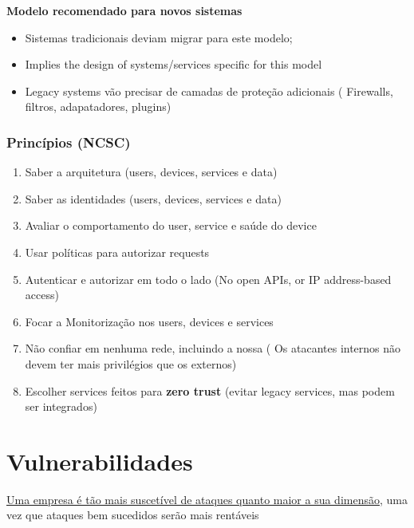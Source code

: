\documentclass{article}
\begin{document}
\begin{flushleft}
\begin{flushleft}
    \textbf{Modelo recomendado para novos sistemas}
    \begin{itemize}
      \item Sistemas tradicionais deviam migrar para este modelo;
      \item Implies the design of systems/services specific for this model
      \item Legacy systems vão precisar de camadas de proteção adicionais (
        Firewalls, filtros, adapatadores, plugins)
    \end{itemize}
  \end{flushleft}

  \subsubsection{Princípios (NCSC)}

  \begin{enumerate}
    \item Saber a arquitetura (users, devices, services e data)
    \item Saber as identidades (users, devices, services e data)
    \item Avaliar o comportamento do user, service e saúde do device
    \item Usar políticas para autorizar requests
    \item Autenticar e autorizar em todo o lado (No open APIs, or IP address-based access)
    \item Focar a Monitorização nos users, devices e services
    \item Não confiar em nenhuma rede, incluindo a nossa (
      Os atacantes internos não devem ter mais privilégios que os externos)
    \item Escolher services feitos para \textbf{zero trust} (evitar legacy services, mas podem ser integrados)
  \end{enumerate}
  \end{flushleft}
  
  \pagebreak

  \section{Vulnerabilidades}

  \uline{Uma empresa é tão mais suscetível de ataques quanto maior a sua dimensão}, uma vez que
  ataques bem sucedidos serão mais rentáveis

  \vspace{2mm}
\end{document}
